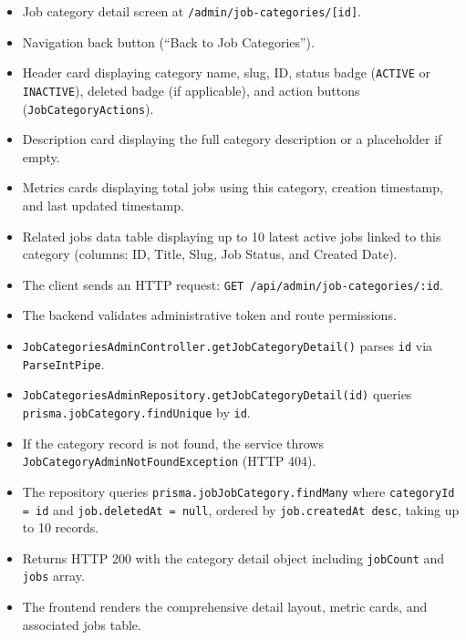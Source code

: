 \begin{itemize}[leftmargin=1.6em,topsep=3pt,itemsep=2pt,parsep=0pt,label=$\bullet$]
    \item Job category detail screen at \texttt{/admin/job-categories/[id]}.
    \item Navigation back button (``Back to Job Categories'').
    \item Header card displaying category name, slug, ID, status badge (\texttt{ACTIVE} or \texttt{INACTIVE}), deleted badge (if applicable), and action buttons (\texttt{JobCategoryActions}).
    \item Description card displaying the full category description or a placeholder if empty.
    \item Metrics cards displaying total jobs using this category, creation timestamp, and last updated timestamp.
    \item Related jobs data table displaying up to 10 latest active jobs linked to this category (columns: ID, Title, Slug, Job Status, and Created Date).
\end{itemize}

\begin{itemize}[leftmargin=1.6em,topsep=3pt,itemsep=2pt,parsep=0pt,label=$\bullet$]
    \item The client sends an HTTP request: \texttt{GET /api/admin/job-categories/:id}.
    \item The backend validates administrative token and route permissions.
    \item \texttt{JobCategoriesAdminController.getJobCategoryDetail()} parses \texttt{id} via \texttt{ParseIntPipe}.
    \item \texttt{JobCategoriesAdminRepository.getJobCategoryDetail(id)} queries \texttt{prisma.jobCategory.findUnique} by \texttt{id}.
    \item If the category record is not found, the service throws \texttt{JobCategory\-Admin\-Not\-Found\-Exception} (HTTP 404).
    \item The repository queries \texttt{prisma.jobJobCategory.findMany} where \texttt{categoryId = id} and \texttt{job.deletedAt = null}, ordered by \texttt{job.createdAt desc}, taking up to 10 records.
    \item Returns HTTP 200 with the category detail object including \texttt{jobCount} and \texttt{jobs} array.
    \item The frontend renders the comprehensive detail layout, metric cards, and associated jobs table.
\end{itemize}

